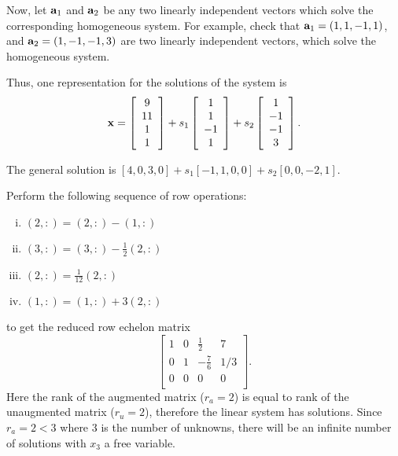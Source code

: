 Now, let $\aa_1$ and $\aa_2$ be any two linearly independent vectors which solve the corresponding homogeneous system. For example, check that $\aa_1 = (1,1,-1,1)$, and $\aa_2 = (1,-1,-1,3)$ are two linearly independent vectors, which solve the homogeneous system.

Thus, one representation for the solutions of the system is
$$
\xx = \left[\begin{array}{c} 9 \\ 11 \\ 1 \\ 1 \end{array}\right] +
s_1\left[\begin{array}{c} 1 \\ 1 \\ -1 \\ 1 \end{array}\right] + s_2\left[\begin{array}{c} 1 \\ -1 \\ -1 \\ 3 \end{array}\right].
$$

\vspace{2mm}
The general solution is $[4,0,3,0]+s_1[-1,1,0,0]+s_2[0,0,-2,1]$.

\vspace{2mm}
Perform the following sequence of row operations:
\begin{enumerate}[i)]
\item $(2,:) = (2,:) - (1,:)$
\item $(3,:) = (3,:) - \frac{1}{2}(2,:)$
\item $(2,:) = \frac{1}{12}(2,:)$
\item $(1,:) = (1,:) + 3(2,:)$
\end{enumerate}
to get the reduced row echelon matrix
$$
\left[\begin{array}{ccc|c}
     1 & 0 & \frac{1}{2} & 7 \\
		 0 & 1 & -\frac{7}{6} & 1/3 \\
		 0 & 0 & 0 & 0 \\
      \end{array}\right].
$$
Here the rank of the augmented matrix ($r_a=2$) is equal to rank of the unaugmented matrix ($r_u = 2$), therefore the linear system has solutions. Since $r_a = 2 < 3$ where 3 is the number of unknowns, there will be an infinite number of solutions with $x_3$ a free variable. 

